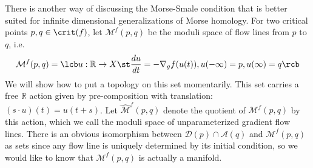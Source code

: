 There is another way of discussing the Morse-Smale condition that is better suited for infinite dimensional generalizations of Morse homology. For two critical points $p,q \in \crit(f)$, let $\mathcal M^f(p,q)$ be the moduli space of flow lines from $p$ to $q$, i.e.
\[ \mathcal M^f(p,q) = \lcb u : \mathbb R \rightarrow X \st \frac{du}{dt} = -\nabla_g f(u(t)), u(-\infty)=p, u(\infty)=q \rcb \]
We will show how to put a topology on this set momentarily. This set carries a free $\mathbb R$ action given by pre-composition with translation: $(s \cdot u)(t) = u(t+s)$. Let $\widehat{\mathcal M}^f(p,q)$ denote the quotient of $\mathcal M^f(p,q)$ by this action, which we call the moduli space of unparameterized gradient flow lines. There is an obvious isomorphism between $\mathscr D(p) \cap \mathscr A(q)$ and $\mathcal M^f(p,q)$ as sets since any flow line is uniquely determined by its initial condition, so we would like to know that $\mathcal M^f(p,q)$ is actually a manifold. 

